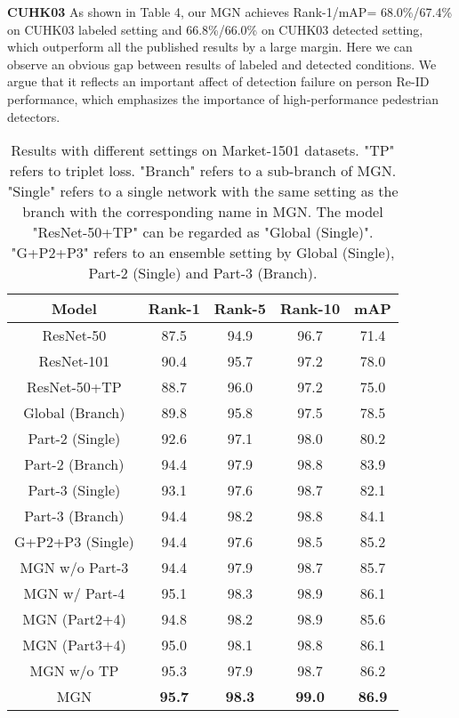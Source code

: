 \documentclass[sigconf]{acmart}
\begin{document}
\textbf{CUHK03} As shown in Table 4, our MGN achieves Rank-1/mAP= 68.0\%/67.4\% on CUHK03 labeled setting and 66.8\%/66.0\% on CUHK03 detected setting, which outperform all the published results by a large margin. Here we can observe an obvious gap between results of labeled and detected conditions. We argue that it reflects an important affect of detection failure on person Re-ID performance, which emphasizes the importance of high-performance pedestrian detectors.

\begin{table} \small
	\label{tab:our_method}
	\centering
	\begin{tabular}{c|cccc}
		\toprule
Model & Rank-1 & Rank-5 & Rank-10 & mAP \\ 
		\midrule
		ResNet-50 & 87.5 & 94.9 & 96.7 & 71.4 \\
		ResNet-101 & 90.4 & 95.7 & 97.2 & 78.0 \\ 
		ResNet-50+TP & 88.7 & 96.0 & 97.2 & 75.0 \\
		\midrule
		Global (Branch) & 89.8 & 95.8 & 97.5 & 78.5 \\
		Part-2 (Single) & 92.6 & 97.1 & 98.0 & 80.2 \\
		Part-2 (Branch) & 94.4 & 97.9 & 98.8 & 83.9 \\
		Part-3 (Single) & 93.1 & 97.6 & 98.7 & 82.1 \\
		Part-3 (Branch) & 94.4 & 98.2 & 98.8 & 84.1 \\
		G+P2+P3 (Single) & 94.4 & 97.6 & 98.5 & 85.2 \\
		\midrule
		MGN w/o Part-3 & 94.4 & 97.9 & 98.7  & 85.7  \\
		MGN w/ Part-4 & 95.1 & 98.3 & 98.9    & 86.1  \\
		\midrule
		MGN (Part2+4) & 94.8 & 98.2 & 98.9 & 85.6 \\
		MGN (Part3+4) & 95.0 & 98.1 & 98.8 & 86.1 \\
		\midrule
		MGN w/o TP & 95.3 & 97.9 & 98.7 & 86.2 \\
		MGN & \textbf{95.7} & \textbf{98.3} & \textbf{99.0} & \textbf{86.9}  \\
		\bottomrule
	\end{tabular}
	\caption{Results with different settings on Market-1501 datasets. "TP" refers to triplet loss. "Branch" refers to a sub-branch of MGN. "Single" refers to a single network with the same setting as the branch with the corresponding name in MGN. The model "ResNet-50+TP" can be regarded as "Global (Single)". "G+P2+P3" refers to an ensemble setting by Global (Single), Part-2 (Single) and Part-3 (Branch).}
\end{table}
\end{document}
